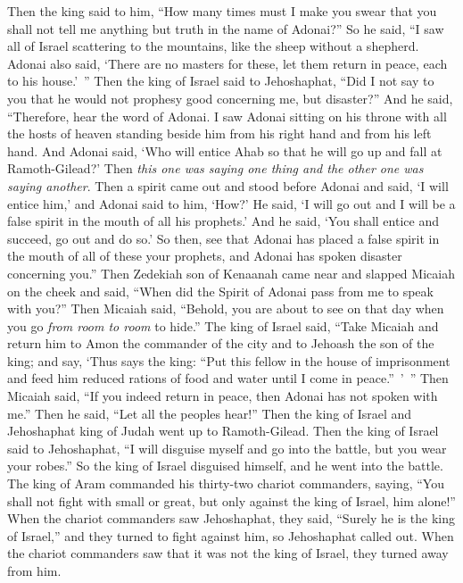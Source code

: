 \begin{biblechapter}
\verse Then the king said to him, “How many times must I make you swear that you shall not tell me anything but truth in the name of Adonai?”
\verse So he said, “I saw all of Israel scattering to the mountains, like the sheep without a shepherd. Adonai also said, ‘There are no masters for these, let them return in peace, each to his house.’ ”
\verse Then the king of Israel said to Jehoshaphat, “Did I not say to you that he would not prophesy good concerning me, but disaster?”
\verse And he said, “Therefore, hear the word of Adonai. I saw Adonai sitting on his throne with all the hosts of heaven standing beside him from his right hand and from his left hand.
\verse And Adonai said, ‘Who will entice Ahab so that he will go up and fall at Ramoth-Gilead?’ Then \textit{this one was saying one thing and the other one was saying another}.
\verse Then a spirit came out and stood before Adonai and said, ‘I will entice him,’ and Adonai said to him, ‘How?’
\verse He said, ‘I will go out and I will be a false spirit in the mouth of all his prophets.’ And he said, ‘You shall entice and succeed, go out and do so.’
\verse So then, see that Adonai has placed a false spirit in the mouth of all of these your prophets, and Adonai has spoken disaster concerning you.”
\verse Then Zedekiah son of Kenaanah came near and slapped Micaiah on the cheek and said, “When did the Spirit of Adonai pass from me to speak with you?”
\verse Then Micaiah said, “Behold, you are about to see on that day when you go \textit{from room to room} to hide.”
\verse The king of Israel said, “Take Micaiah and return him to Amon the commander of the city and to Jehoash the son of the king;
\verse and say, ‘Thus says the king: “Put this fellow in the house of imprisonment and feed him reduced rations of food and water until I come in peace.” ’ ”
\verse Then Micaiah said, “If you indeed return in peace, then Adonai has not spoken with me.” Then he said, “Let all the peoples hear!”
\verse Then the king of Israel and Jehoshaphat king of Judah went up to Ramoth-Gilead.
\verse Then the king of Israel said to Jehoshaphat, “I will disguise myself and go into the battle, but you wear your robes.” So the king of Israel disguised himself, and he went into the battle.
\verse The king of Aram commanded his thirty-two chariot commanders, saying, “You shall not fight with small or great, but only against the king of Israel, him alone!”
\verse When the chariot commanders saw Jehoshaphat, they said, “Surely he is the king of Israel,” and they turned to fight against him, so Jehoshaphat called out.
\verse When the chariot commanders saw that it was not the king of Israel, they turned away from him.

\end{biblechapter}
